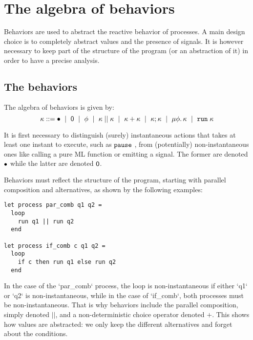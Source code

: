 \documentclass[9pt,preprint]{sigplanconf}
\newcommand{\sdeq}{::=}
\begin{document}
\section{The algebra of behaviors}

Behaviors are used to abstract the reactive behavior of processes. A main design choice is to completely abstract values and the presence of signals. It is however necessary to keep part of the structure of the program (or an abstraction of it) in order to have a precise analysis.

\subsection{The behaviors}

The algebra of behaviors is given by:
\[
\rk \sdeq \effplus ~\mid~ \effmin ~\mid~ \effvar ~\mid~ \effpar{\rk}{\rk} ~\mid~ \effor{\rk}{\rk}
~\mid~ \effcon{\rk}{\rk}  ~\mid~ \effrec{\effvar}{\rk}  ~\mid~ \effrun{\rk}
\]

It is first necessary to distinguish (surely) instantaneous actions that takes at least one instant to execute, such as $\mathtt{pause}\;{}$, from (potentially) non-instantaneous ones like calling a pure ML function or emitting a signal. The former are denoted $\bullet{}$ while the latter are denoted $\textsf{0}$.

Behaviors must reflect the structure of the program, starting with parallel composition and alternatives, as shown by the following examples: 
\begin{lstlisting}
let process par_comb q1 q2 =
  loop
    run q1 || run q2
  end

let process if_comb c q1 q2 =
  loop
    if c then run q1 else run q2
  end
\end{lstlisting}
In the case of the `par_comb` process, the loop is non-instantaneous if either `q1` or `q2` is non-instantaneous, while in the case of `if_comb`, both processes must be non-instantaneous. That is why behaviors include the parallel composition, simply denoted $||$, and a non-deterministic choice operator denoted $+$. This shows how values are abstracted: we only keep the different alternatives and forget about the conditions.
\end{document}
